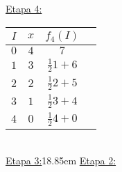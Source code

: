 \documentclass[MIOP.tex]{subfiles}
\begin{document}
\begin{solucion}
\underline{Etapa 4:}\

\begin{tabular}{|c| c| c| c |}
\hline
$I$ & $x$ & $f_4(I)$ \\
\hline
$0$ & $4$ & $7$   \\
\hline
$1$ & $3$ & $\frac{1}{2}1+6$  \\
\hline
$2$ & $2$ & $\frac{1}{2}2+5$  \\
\hline
$3$ & $1$ & $\frac{1}{2}3+4$   \\
\hline
$4$ & $0$ & $\frac{1}{2}4+0$ \\
\hline
\end{tabular}\
\\

\underline{Etapa 3:}\kern 18.85em \underline{Etapa 2:}


\end{solucion}
\end{document}
